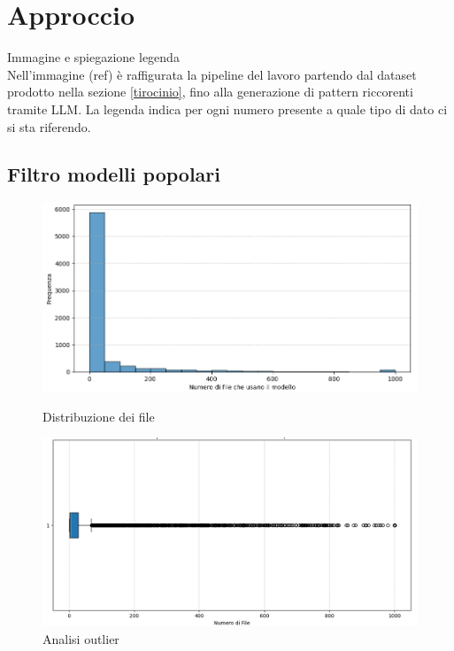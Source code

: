 \documentclass{article}
\begin{document}
\section{Approccio}
Immagine e spiegazione legenda\\
Nell'immagine (ref) è raffigurata la pipeline del lavoro partendo dal dataset prodotto nella sezione \ref{tirocinio}, fino alla generazione di pattern riccorenti tramite LLM. La legenda indica per ogni numero presente a quale tipo di dato ci si sta riferendo.\\
\subsection{Filtro modelli popolari}
\begin{figure}[h]
    \centering
    \begin{minipage}{0.45\textwidth}
        \centering
        \includegraphics[width=\linewidth]{images/approccio1.png}
        \caption{Distribuzione dei file}
        \label{fig:distribuzione_file1}
    \end{minipage}
    \hfill
    \begin{minipage}{0.45\textwidth}
        \centering
        \includegraphics[width=\linewidth]{images/approccio2.png}
        \caption{Analisi outlier}
        \label{fig:outlier_file1}
    \end{minipage}
\end{figure}
\end{document}

